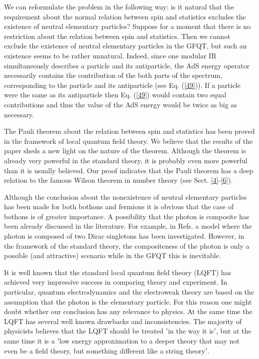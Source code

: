 \documentclass[a4paper,12pt]{article}%
\begin{document}
We can reformulate the problem in the following way: is it natural 
that the requirement about the normal relation between spin and
statistics excludes the existence of neutral elementary
particles? Suppose for a moment that there is no restriction
about the relation between spin and statistics. Then we cannot
exclude the existence of neutral elementary particles in the
GFQT, but such an existence seems to be rather unnatural.
Indeed, since one modular IR simultaneously describes a 
particle and its antiparticle, the AdS energy operator 
necessarily contains the contribution of
the both parts of the spectrum, corresponding to the particle
and its antiparticle (see Eq. (\ref{49})). If a particle
were the same as its antiparticle then Eq. (\ref{49}) would 
contain two equal contributions and thus the value of the AdS
energy would be twice as big as necessary. 

The Pauli theorem about the relation between spin and
statistics \cite{Pauli} has been proved in the framework
of local quantum field theory. We believe that the results
of the paper sheds a new light on the nature of the  
theorem. Although the theorem is already very powerful in
the standard theory, it is probably even more powerful 
than it is usually believed. Our proof indicates that
the Pauli theorem has a deep relation to the famous
Wilson theorem in number theory (see Sect. \ref{4}-\ref{6}). 

Although the conclusion about the nonexistence
of neutral elementary particles has been
made for both bothons and fermions it is obvious that
the case of bothons is of greater importance. 
A possibility that the photon is composite has been 
already discussed in the literature. For 
example, in Refs. \cite{FF,Castell,FronsdalS} a model 
where the photon is composed of two Dirac singletons 
\cite{DiracS} has been investigated. However, in the 
framework of the standard theory, the compositeness of 
the photon is only a possible (and attractive) scenario 
while in the GFQT this is inevitable.

It is well
known that the standard local quantum field theory (LQFT)
has achieved very impressive success in comparing theory 
and experiment. In particular, quantum 
electrodynamics and the electroweak theory are based
on the assumption that the photon is the elementary
particle. For this reason one might doubt whether our
conclusion has any relevance to physics. At the same time
the LQFT has several well known 
drawbacks and inconsistencies. The majority of physicists
believes that \cite{Wein} the LQFT
should be treated $'$in the way it is$'$, but at the same
time it is \cite{Wein} a $'$low energy approximation to a
deeper theory that may not even be a field theory, but 
something different like a string theory$'$.  
\end{document}
